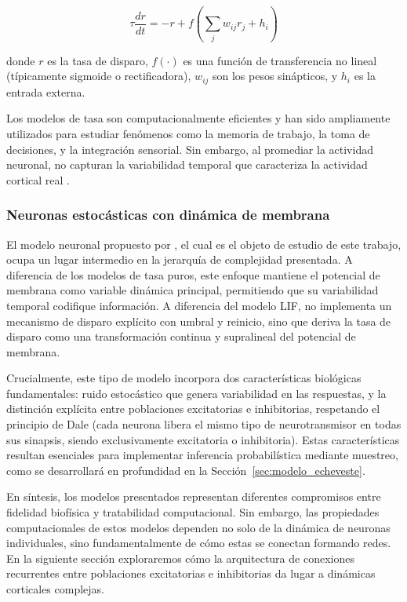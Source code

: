 \begin{equation}
\tau \frac{dr}{dt} = -r + f\left(\sum_j w_{ij} r_j + h_i\right)
\label{eq:rate_model}
\end{equation}

donde $r$ es la tasa de disparo, $f(\cdot)$ es una función de transferencia no lineal (típicamente sigmoide o rectificadora), $w_{ij}$ son los pesos sinápticos, y $h_i$ es la entrada externa.

Los modelos de tasa son computacionalmente eficientes y han sido ampliamente utilizados para estudiar fenómenos como la memoria de trabajo, la toma de decisiones, y la integración sensorial. Sin embargo, al promediar la actividad neuronal, no capturan la variabilidad temporal que caracteriza la actividad cortical real \citep{gerstner2002spiking}.


\subsubsection{Neuronas estocásticas con dinámica de membrana}

El modelo neuronal propuesto por \cite{echeveste2020cortical}, el cual es el objeto de estudio de este trabajo, ocupa un lugar intermedio en la jerarquía de complejidad presentada. A diferencia de los modelos de tasa puros, este enfoque mantiene el potencial de membrana como variable dinámica principal, permitiendo que su variabilidad temporal codifique información. A diferencia del modelo LIF, no implementa un mecanismo de disparo explícito con umbral y reinicio, sino que deriva la tasa de disparo como una transformación continua y supralineal del potencial de membrana.


Crucialmente, este tipo de modelo incorpora dos características biológicas fundamentales: ruido estocástico que genera variabilidad en las respuestas, y la distinción explícita entre poblaciones excitatorias e inhibitorias, respetando el principio de Dale (cada neurona libera el mismo tipo de neurotransmisor en todas sus sinapsis, siendo exclusivamente excitatoria o inhibitoria). Estas características resultan esenciales para implementar inferencia probabilística mediante muestreo, como se desarrollará en profundidad en la Sección~\ref{sec:modelo_echeveste}.

En síntesis, los modelos presentados representan diferentes compromisos entre fidelidad biofísica y tratabilidad computacional. Sin embargo, las propiedades computacionales de estos modelos dependen no solo de la dinámica de neuronas individuales, sino fundamentalmente de cómo estas se conectan formando redes. En la siguiente sección exploraremos cómo la arquitectura de conexiones recurrentes entre poblaciones excitatorias e inhibitorias da lugar a dinámicas corticales complejas.

